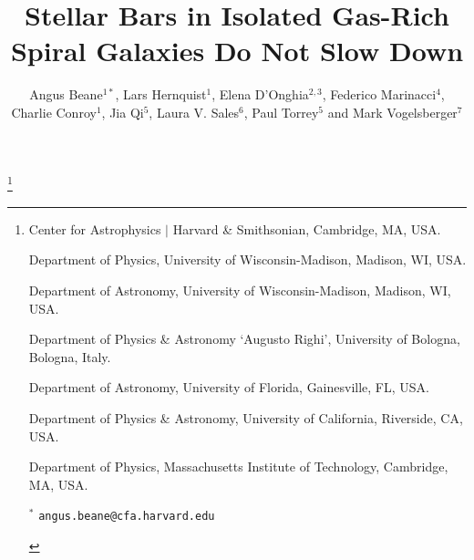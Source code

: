 \documentclass{natureprintstyle}
\title{Stellar Bars in Isolated Gas-Rich Spiral Galaxies Do Not Slow Down}
\author{Angus Beane$^{1*}$, Lars Hernquist$^1$, Elena D'Onghia$^{2,3}$,
Federico Marinacci$^{4}$, Charlie Conroy$^{1}$, Jia Qi$^{5}$, Laura V.
Sales$^{6}$, Paul Torrey$^{5}$ and Mark Vogelsberger$^{7}$}
\begin{document}
\maketitle

{\let\thefootnote\relax\footnote{

\begin{affiliations}
\item Center for Astrophysics $|$ Harvard \& Smithsonian,  Cambridge, MA, USA.

\item Department of Physics, University of Wisconsin-Madison, Madison, WI, USA.

\item Department of Astronomy, University of Wisconsin-Madison, Madison, WI, USA.

\item Department of Physics \& Astronomy `Augusto Righi', University of Bologna, Bologna, Italy.

\item Department of Astronomy, University of Florida, Gainesville, FL, USA.

\item Department of Physics \& Astronomy, University of California, Riverside, CA, USA.

\item Department of Physics, Massachusetts Institute of Technology, Cambridge, MA, USA.

$^{*}$ \texttt{\mbox{angus.beane@cfa.harvard.edu}}

\end{affiliations}
}}

\end{document}

